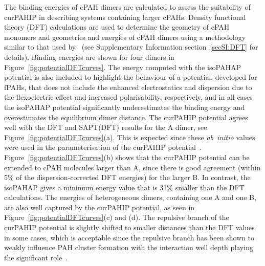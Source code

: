 The binding energies of cPAH dimers are calculated to assess the suitability of curPAHIP in describing systems containing larger cPAHs. Density functional theory (DFT) calculations are used to determine the geometry of cPAH monomers and geometries and energies of cPAH dimers using a methodology similar to that used by~\citet{Martin2018polar} (see Supplementary Information section~\ref{secSI:DFT} for details). Binding energies are shown for four dimers in Figure~\ref{fig:potentialDFTcurves}. The energy computed with the isoPAHAP potential is also included to highlight the behaviour of a potential, developed for fPAHs, that does not include the enhanced electrostatics and dispersion due to the flexoelectric effect and increased polarisability, respectively, and in all cases the isoPAHAP potential significantly underestimates the binding energy and overestimates the equilibrium dimer distance.
The curPAHIP potential agrees well with the DFT and SAPT(DFT) results for the A dimer, see Figure~\ref{fig:potentialDFTcurves}(a). This is expected since these \textit{ab~initio} values were used in the parameterisation of the curPAHIP potential~\cite{bowal2019ion}. 
Figure~\ref{fig:potentialDFTcurves}(b) shows that the curPAHIP potential can be extended to cPAH molecules larger than A, since there is good agreement (within 5\% of the dispersion-corrected DFT energies) for the larger B. In contrast, the isoPAHAP gives a minimum energy value that is 31\% smaller than the DFT calculations.
The energies of heterogeneous dimers, containing one A and one B, are also well captured by the curPAHIP potential, as seen in Figure~\ref{fig:potentialDFTcurves}(c) and (d). The repulsive branch of the curPAHIP potential is slightly shifted to smaller distances than the DFT values in some cases, which is acceptable since the repulsive branch has been shown to weakly influence PAH cluster formation with the interaction well depth playing the significant role~\cite{Pascazio2017}.

